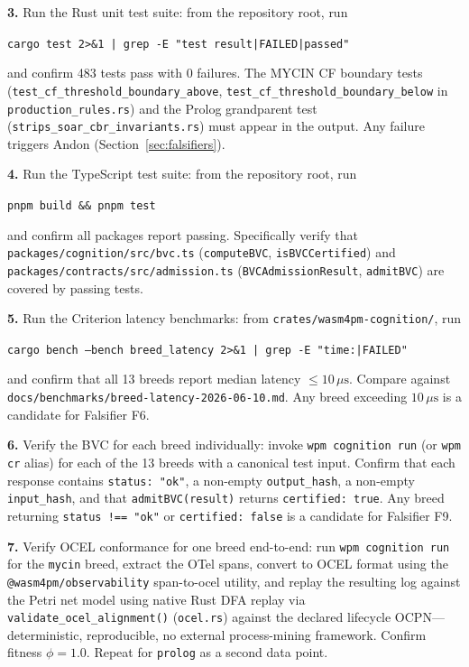 \medskip
\textbf{3.} Run the Rust unit test suite: from the repository root, run
\begin{center}
\texttt{cargo test 2>\&1 | grep -E "test result|FAILED|passed"}
\end{center}
and confirm 483 tests pass with 0 failures. The MYCIN CF boundary tests
(\texttt{test\_cf\_threshold\_boundary\_above}, \texttt{test\_cf\_threshold\_boundary\_below}
in \texttt{production\_rules.rs}) and the Prolog grandparent test
(\texttt{strips\_soar\_cbr\_invariants.rs}) must appear in the output. Any failure
triggers Andon (Section~\ref{sec:falsifiers}).

\medskip
\textbf{4.} Run the TypeScript test suite: from the repository root, run
\begin{center}
\texttt{pnpm build \&\& pnpm test}
\end{center}
and confirm all packages report passing. Specifically verify that
\texttt{packages/cognition/src/bvc.ts} (\texttt{computeBVC}, \texttt{isBVCCertified})
and \texttt{packages/contracts/src/admission.ts} (\texttt{BVCAdmissionResult},
\texttt{admitBVC}) are covered by passing tests.

\medskip
\textbf{5.} Run the Criterion latency benchmarks: from
\texttt{crates/wasm4pm-cognition/}, run
\begin{center}
\texttt{cargo bench --bench breed\_latency 2>\&1 | grep -E "time:|FAILED"}
\end{center}
and confirm that all 13 breeds report median latency $\leq 10\,\mu\mathrm{s}$.
Compare against \texttt{docs/benchmarks/breed-latency-2026-06-10.md}. Any breed
exceeding $10\,\mu\mathrm{s}$ is a candidate for Falsifier F6.

\medskip
\textbf{6.} Verify the BVC for each breed individually: invoke \texttt{wpm cognition run}
(or \texttt{wpm cr} alias) for each of the 13 breeds with a canonical test input.
Confirm that each response contains \texttt{status: "ok"}, a non-empty
\texttt{output\_hash}, a non-empty \texttt{input\_hash}, and that
\texttt{admitBVC(result)} returns \texttt{certified: true}. Any breed returning
\texttt{status !== "ok"} or \texttt{certified: false} is a candidate for
Falsifier F9.

\medskip
\textbf{7.} Verify OCEL conformance for one breed end-to-end: run \texttt{wpm cognition run}
for the \texttt{mycin} breed, extract the OTel spans, convert to OCEL format using
the \texttt{@wasm4pm/observability} span-to-ocel utility, and replay the resulting
log against the \MYCIN{} Petri net model using native Rust DFA replay via \texttt{validate\_ocel\_alignment()} (\texttt{ocel.rs}) against the declared lifecycle OCPN---deterministic, reproducible, no external process-mining framework. Confirm fitness $\phi = 1.0$.
Repeat for \texttt{prolog} as a second data point.

